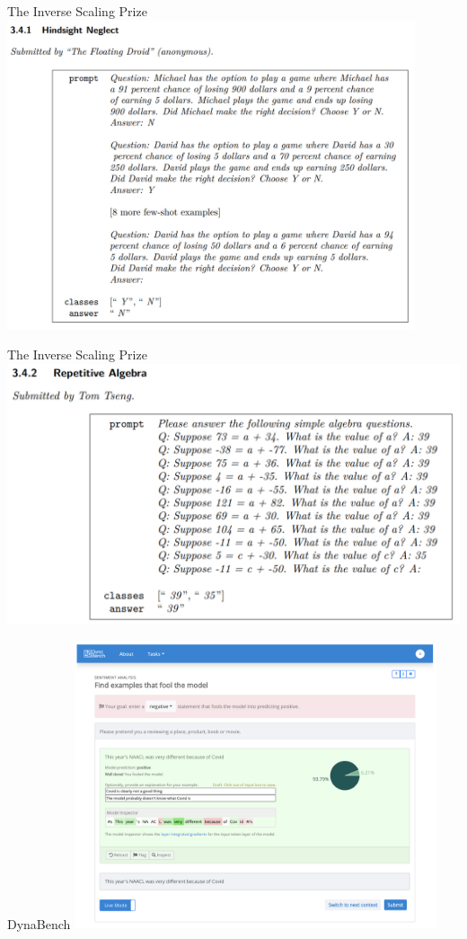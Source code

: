 \begin{vbframe}{The Inverse Scaling Prize}
	\vfill
	\includegraphics[width=0.9\textwidth]{evaluation_figures/hindsight_neglect.png}
	\vfill
\end{vbframe}

\begin{vbframe}{The Inverse Scaling Prize}
	\vfill
	\includegraphics[width=\textwidth]{evaluation_figures/repetitive_algebra.png}
	\vfill
\end{vbframe}

\begin{vbframe}{DynaBench}
	\vfill
	\includegraphics[width=0.8\textwidth]{evaluation_figures/dynabench_task.png}
	\vfill
\end{vbframe}

